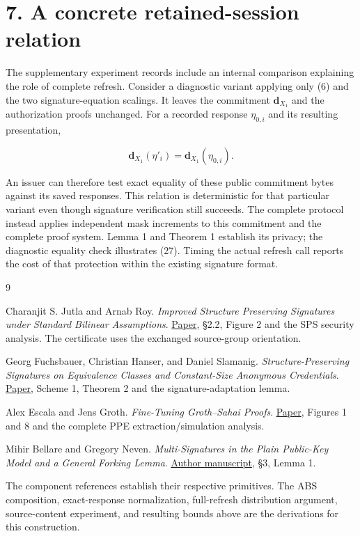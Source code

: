 \documentclass[11pt]{article}
\begin{document}
\section*{7. A concrete retained-session relation}


The supplementary experiment records include an internal comparison explaining the role of complete refresh. Consider a diagnostic variant applying only (6) and the two signature-equation scalings. It leaves the commitment \(\boldsymbol d_{X_1}\) and the authorization proofs unchanged. For a recorded response \(\eta_{0,i}\) and its resulting presentation,

\[
\boldsymbol d_{X_1}(\eta'_i)=\boldsymbol d_{X_1}(\eta_{0,i}).
\tag{27}
\]

An issuer can therefore test exact equality of these public commitment bytes against its saved responses. This relation is deterministic for that particular variant even though signature verification still succeeds. The complete protocol instead applies independent mask increments to this commitment and the complete proof system. Lemma 1 and Theorem 1 establish its privacy; the diagnostic equality check illustrates (27). Timing the actual refresh call reports the cost of that protection within the existing signature format.

\begin{thebibliography}{9}


 Charanjit S. Jutla and Arnab Roy. \emph{Improved Structure Preserving Signatures under Standard Bilinear Assumptions}. \href{https://eprint.iacr.org/2017/025.pdf}{Paper}, §2.2, Figure 2 and the SPS security analysis. The certificate uses the exchanged source-group orientation.

 Georg Fuchsbauer, Christian Hanser, and Daniel Slamanig. \emph{Structure-Preserving Signatures on Equivalence Classes and Constant-Size Anonymous Credentials}. \href{https://eprint.iacr.org/2014/944.pdf}{Paper}, Scheme 1, Theorem 2 and the signature-adaptation lemma.

 Alex Escala and Jens Groth. \emph{Fine-Tuning Groth–Sahai Proofs}. \href{https://eprint.iacr.org/2013/662.pdf}{Paper}, Figures 1 and 8 and the complete PPE extraction/simulation analysis.

 Mihir Bellare and Gregory Neven. \emph{Multi-Signatures in the Plain Public-Key Model and a General Forking Lemma}. \href{https://cseweb.ucsd.edu/~mihir/papers/multisignatures.pdf}{Author manuscript}, §3, Lemma 1.


\end{thebibliography}

The component references establish their respective primitives. The ABS composition, exact-response normalization, full-refresh distribution argument, source-content experiment, and resulting bounds above are the derivations for this construction.
\end{document}
